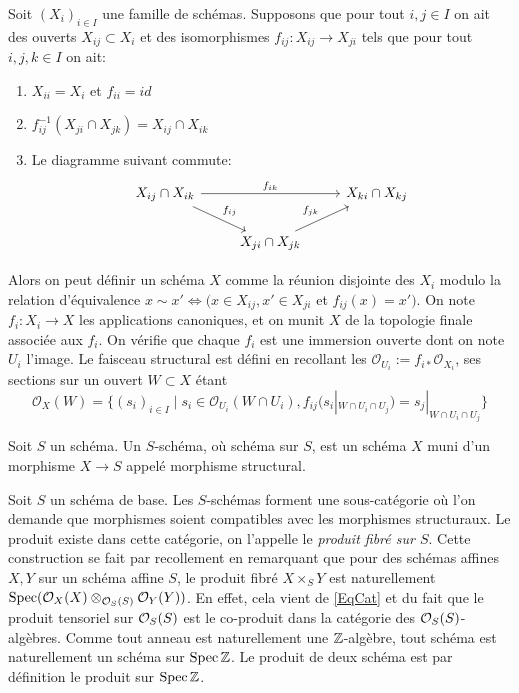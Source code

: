 \begin{cons}\label{gluevar}
Soit $(X_i)_{i\in I}$ une famille de schémas. Supposons que pour tout $i,j\in I$ on ait des ouverts $X_{ij}\subset X_i$ et des isomorphismes $f_{ij}:X_{ij}\rightarrow X_{ji}$ tels que pour tout $i,j,k\in I$ on ait:
	\begin{enumerate}
	\item $X_{ii}=X_i$ et $f_{ii}=id$
	\item $f_{ij}^{-1}(X_{ji} \cap X_{jk}) =  X_{ij} \cap X_{ik}$
	\item Le diagramme suivant commute:
	$$
		\begin{tikzcd}
		  X_{ij}\cap X_{ik} \arrow[rd, "f_{ij}"] \arrow[rr, "f_{ik}"] & & X_{ki}\cap X_{kj}\\
  		 & X_{ji}\cap X_{jk} \arrow[ru, "f_{jk}"] &
	\end{tikzcd}
	$$
	\end{enumerate}
Alors on peut définir un schéma $X$ comme la réunion disjointe des $X_i$ modulo la relation d'équivalence $x\sim x' \iff (x\in X_{ij}, x'\in X_{ji}$ et $f_{ij}(x)=x')$. On note $f_i:X_i\rightarrow X$ les applications canoniques, et on munit 
$X$ de la topologie finale associée aux $f_i$. On vérifie que chaque $f_i$ est une immersion ouverte dont on note $U_i$ l'image. Le faisceau structural est défini en recollant les $\mathcal{O}_{U_i}:=f_{i*}\mathcal{O}_{X_i}$, ses sections sur un ouvert $W\subset X$ étant $$
\mathcal{O}_X(W) =
\{
(s_i)_{i \in I} \mid
s_i \in \mathcal{O}_{U_i}(W \cap U_i),
f_{ij}(s_i|_{W \cap U_i \cap U_j}) = s_j|_{W \cap U_i \cap U_j}
\}
$$
\end{cons}


\begin{defn}
Soit $S$ un schéma. Un $S$-schéma, où schéma sur $S$, est un schéma $X$ muni d'un morphisme $X\rightarrow S$ appelé morphisme structural.
\end{defn}

Soit $S$ un schéma de base. Les $S$-schémas forment une sous-catégorie où l'on demande que morphismes soient compatibles avec les morphismes structuraux. Le produit existe dans cette catégorie, on l'appelle le \textit{produit fibré sur $S$}. Cette construction se fait par recollement en remarquant que pour des schémas affines $X,Y$ sur un schéma affine $S$, le produit fibré $X\times_S Y$ est naturellement $\operatorname{Spec} (\mathcal{O}_X(X)\otimes_{\mathcal{O}_S(S)}\mathcal{O}_Y(Y))$. En effet, cela vient de \ref{EqCat} et du fait que le produit tensoriel sur $\mathcal{O}_S(S)$ est le co-produit dans la catégorie des $\mathcal{O}_S(S)$-algèbres. 
Comme tout anneau est naturellement une $\mathbb{Z}$-algèbre, tout schéma est naturellement un schéma sur $\operatorname{Spec} \mathbb{Z}$. Le produit de deux schéma est par définition le produit sur $\operatorname{Spec} \mathbb{Z}$.

